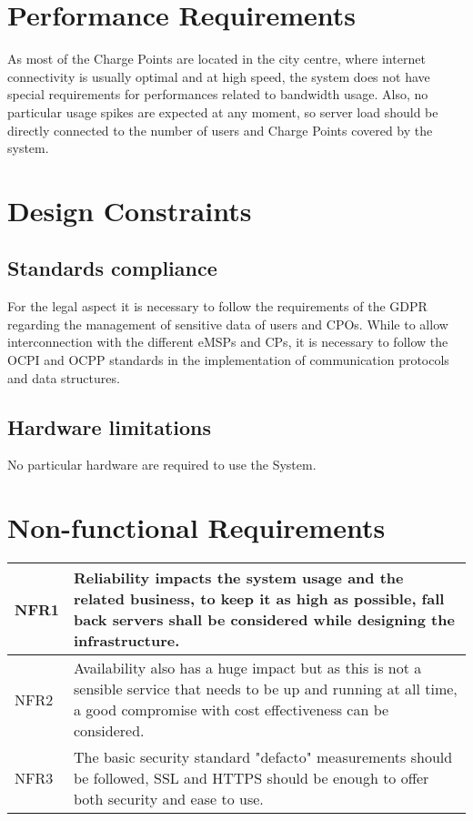 \clearpage
\newpage

\section{Performance Requirements}
As most of the Charge Points are located in the city centre, where internet connectivity is usually optimal and at high speed, the system does not have special requirements for performances related to bandwidth usage. Also, no particular usage spikes are expected at any moment, so server load should be directly connected to the number of users and Charge Points covered by the system.

\section{Design Constraints}
\subsection{Standards compliance}
For the legal aspect it is necessary to follow the requirements of the GDPR regarding the management of sensitive data of users and CPOs. While to allow interconnection with the different eMSPs and CPs, it is necessary to follow the OCPI and OCPP standards in the implementation of communication protocols and data structures.

\subsection{Hardware limitations}
No particular hardware are required to use the System.

\section{Non-functional Requirements}

{
\setlength\extrarowheight{5pt}
\begin{tabular}{|p{3cm}|p{10cm}|}
	\hline
	NFR1 & Reliability impacts the system usage and the related business, to keep it as high as possible, fall back servers shall be considered while designing the infrastructure.\\
	\hline
	NFR2 & Availability also has a huge impact but as this is not a sensible service that needs to be up and running at all time, a good compromise with cost effectiveness can be considered.\\
	\hline
	NFR3 & The basic security standard "defacto" measurements should be followed, SSL and HTTPS should be enough to offer both security and ease to use.\\
	\hline
\end{tabular}
}

